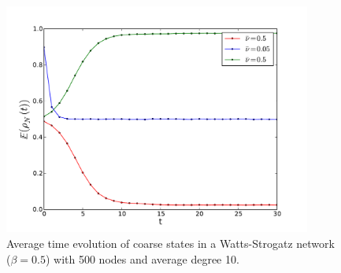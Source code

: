 \documentclass[]{article}
\begin{document}
\begin{figure}
\includegraphics[width=0.9\textwidth]{time_evolution_small_world_beta5_M250_N500.pdf}
\caption{Average time evolution of coarse states in a Watts-Strogatz network ($\beta=0.5$) with  500 nodes and average degree 10.}
\label{fig:time_evolution_watts}
\end{figure}








\end{document}
